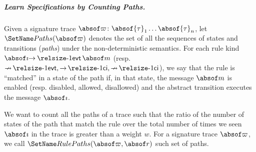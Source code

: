 \subparagraph{Learn Specifications by Counting Paths.}
%
Given a signature trace
$\abstrace\colon \absof{\trans}_1 \ldots \absof{\trans}_n$, let
$\AbsPaths{\abstrace}$ denotes the set of all the sequences of
states and transitions (\emph{paths}) under the non-deterministic
semantics.
%
For each rule kind $\specEnable{\absforce}{\absmsg}$
(resp. $\nspecArrow \specDisableOp, \specArrow \specAllowOp, \nspecArrow \specDisallowOp$),
we say that the rule is ``matched'' in a state of the path if, in that state,
the message $\absmsg$ is enabled (resp. disabled, allowed, disallowed)
and the abstract transition executes the message $\absforce$.

We want to count all the paths of a trace such that the ratio of the number of
states of the path that match the rule over the total number of times we seen
$\absforce$ in the trace is greater than a weight $w$.
%
For a signature trace $\abstrace$, we
call \(\AbsPathsRule{\abstrace}{\absrule}\) such set of paths.

